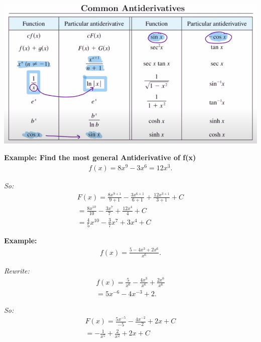 \documentclass{report}
\begin{document}
  \bigbreak \noindent 
  \begin{center}
    \includegraphics[scale=0.6]{ ./images/26.png }
  \end{center}

  \pagebreak \bigbreak \noindent
  \begin{mdframed}
    \textbf{Example: Find the most general Antiderivative of f(x)}
    \begin{align*}
      f(x) = 8x^{9}-3x^{6}=12x^{3}
    .\end{align*}
  \end{mdframed}

  \bigbreak \noindent
  \textit{So:}
  \begin{align*}
    F(x) = \frac{8x^{9+1}}{9+1} - \frac{3x^{6+1}}{6+1} +\frac{12x^{3+1}}{3+1} + C \\
    = \frac{8x^{10}}{10} -\frac{3x^{7}}{7} +\frac{12x^{4}}{4} + C \\
    = \frac{4}{5}x^{10} - \frac{3}{7}x^{7}+3x^{4} +C
  \end{align*}

  \bigbreak \noindent 
  \begin{mdframed}
    \textbf{Example: }
    \begin{align*}
      f(x) = \frac{5 - 4x^{3} +2x^{6}}{x^{6}}
    .\end{align*}
  \end{mdframed}

  \bigbreak \noindent 
  \textit{Rewrite:}
  \begin{align*}
    f(x) = \frac{5}{x^{6}} -\frac{4x^{3}}{x^{6}} +\frac{2x^{6}}{x^{6}} \\
    = 5x^{-6}-4x^{-3}+2
  .\end{align*}

  \bigbreak \noindent
  \textit{So:}
  \begin{align*}
    F(x) = \frac{5x^{-5}}{-5} - \frac{4x^{-2}}{-2} +2x + C \\
    = -\frac{1}{x^{5}} + \frac{2}{x^{2}} + 2x +C
  \end{align*}
\end{document}
